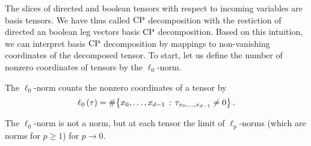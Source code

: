 



\label{sec:basisCP}



The slices of directed and boolean tensors with respect to incoming variables are basis tensors.
We have thus called $\mathrm{CP}$ decomposition with the restiction of directed an boolean leg vectors basis $\mathrm{CP}$ decomposition.
Based on this intuition, we can interpret basis $\mathrm{CP}$ decomposition by mappings to non-vanishing coordinates of the decomposed tensor.
To start, let us define the number of nonzero coordinates of tensors by the $\ell_0$-norm.

\begin{definition}
    The $\ell_0$-norm counts the nonzero coordinates of a tensor by
    \begin{align*}
        \ell_0\left(\tau\right) = \#\big\{ x_{0},\ldots,x_{d-1} \,:\, \tau_{x_{0},\ldots,x_{d-1} }\neq 0 \big\} \, .
    \end{align*}
\end{definition}

The $\ell_0$-norm is not a norm, but at each tensor the limit of $\ell_p$-norms (which are norms for $p\geq1$) for $p \rightarrow 0$.

